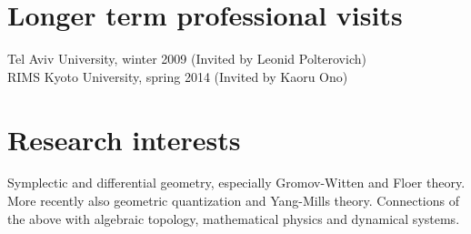 \documentclass[overlapped,line,letterpaper]{res}
\begin{document}
\begin{resume}
\section {\sc Longer term professional visits}
Tel Aviv University, winter 2009  (Invited by Leonid Polterovich) \\
RIMS Kyoto University, spring 2014 (Invited by Kaoru Ono) \\
\section{\sc Research interests} 
Symplectic and differential geometry, especially Gromov-Witten and
Floer theory. More recently also geometric quantization and Yang-Mills
theory. Connections of the above with algebraic topology, mathematical physics and dynamical
systems. 


\end{resume}
\end{document}
